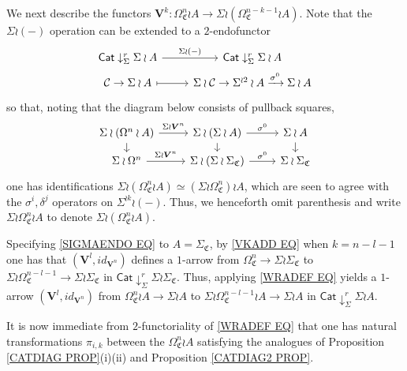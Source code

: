 \documentclass[a4paper,10pt
]{article}%
\numberwithin{equation}{section}
\numberwithin{figure}{section}
\theoremstyle{definition} %
\newcommand{\1}{\ensuremath{\mathbbm 1}}%
\begin{document}
We next describe the functors
$\boldsymbol{V}^k \colon \Omega^n_{\mathfrak{C}} \wr A
\to 
\Sigma \wr \left(\Omega^{n-k-1}_{\mathfrak{C}} \wr A \right)$.
Note that the $\Sigma \wr (-)$ operation can be extended to a $2$-endofunctor
\begin{equation}\label{SIGMAENDO EQ}
\begin{tikzcd}[row sep = 0pt]
\mathsf{Cat} \downarrow^r_{\Sigma} \Sigma \wr A \ar{r}{\Sigma \wr (-)} &
\mathsf{Cat} \downarrow^r_{\Sigma} \Sigma \wr A
\\
\mathcal{C} \to \Sigma \wr A \ar[mapsto]{r} &
\Sigma \wr \mathcal{C} \to \Sigma^{\wr 2} \wr A \xrightarrow{\sigma^{0}} \Sigma \wr A 
\end{tikzcd}
\end{equation}
so that, noting that the diagram below consists of pullback squares,
\begin{equation}
\begin{tikzcd}[row sep = 8pt]
\Sigma \wr (\Omega^n \wr A) \ar{r}{\Sigma \wr \boldsymbol{V}^n} \ar{d} &
\Sigma \wr (\Sigma \wr A) \ar{d} \ar{r}{\sigma^0} &
\Sigma \wr A  \ar{d}
\\
\Sigma \wr \Omega^n \ar{r}{\Sigma \wr \boldsymbol{V}^n} &
\Sigma \wr (\Sigma \wr \Sigma_{\mathfrak{C}}) \ar{r}{\sigma^0} &
\Sigma \wr \Sigma_{\mathfrak{C}}
\end{tikzcd}
\end{equation}
one has identifications
$\Sigma \wr \left(\Omega^{n}_{\mathfrak{C}} \wr A \right)
\simeq 
\left(\Sigma \wr \Omega^{n}_{\mathfrak{C}}\right) \wr A $,
which are seen to agree with the $\sigma^i,\delta^j$ operators on $\Sigma^{\wr k} \wr (-)$.
Thus, we henceforth omit parenthesis and write 
$\Sigma \wr \Omega^{n}_{\mathfrak{C}} \wr A$
to denote 
$\Sigma \wr \left(\Omega^{n}_{\mathfrak{C}} \wr A \right)$.

Specifying \eqref{SIGMAENDO EQ} to $A = \Sigma_{\mathfrak{C}}$,
by \eqref{VKADD EQ} when $k=n-l-1$ one has that
$(\boldsymbol{V}^l,id_{\boldsymbol{V}^{n}})$
defines a $1$-arrow from 
$\Omega^n_{\mathfrak{C}} \to \Sigma \wr \Sigma_{\mathfrak{C}}$
to 
$\Sigma \wr \Omega^{n-l-1}_{\mathfrak{C}} \to \Sigma \wr \Sigma_{\mathfrak{C}}$
in
$\mathsf{Cat} \downarrow^r_{\Sigma} \Sigma \wr \Sigma_{\mathfrak{C}}$. 
Thus, applying \eqref{WRADEF EQ} yields a $1$-arrow
$(\boldsymbol{V}^l,id_{\boldsymbol{V}^{n}})$
from
$\Omega^n_{\mathfrak{C}}\wr A \to \Sigma \wr A$
to 
$\Sigma \wr \Omega^{n-l-1}_{\mathfrak{C}} \wr A \to \Sigma \wr A$
in
$\mathsf{Cat} \downarrow^r_{\Sigma} \Sigma \wr A$.

It is now immediate from $2$-functoriality of
\eqref{WRADEF EQ}
that one has natural transformations $\pi_{i,k}$
between the $\Omega^n_{\mathfrak{C}}\wr A$
satisfying the analogues of 
Proposition \ref{CATDIAG PROP}(i)(ii) and Proposition \ref{CATDIAG2 PROP}.
\end{document}
